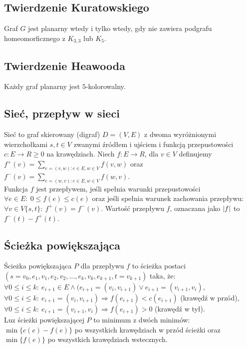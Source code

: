\subsection*{Twierdzenie Kuratowskiego}
Graf $G$ jest planarny wtedy i tylko wtedy, gdy nie zawiera podgrafu homeomorficznego
z $K_{3, 3}$ lub $K_5$.

\subsection*{Twierdzenie Heawooda}
Każdy graf planarny jest $5$-kolorowalny.

\subsection*{Sieć, przepływ w sieci}
Sieć to graf skierowany (digraf) $D = (V, E)$ z dwoma wyróżnionymi wierzchołkami
$s, t \in V$ zwanymi źródłem i ujściem i funkcją przepustowości $c: E \to R \geq 0$
na krawędziach. Niech $f: E \to R$, dla $v \in V$ definujemy 
$f^+(v) = \sum\limits_{e = (v, w): e \in E, w \in V} f(v, w)$ oraz
$f^-(v) = \sum\limits_{e = (w, v): e \in E, w \in V} f(w, v)$. \\ 
Funkcja $f$ jest przepływem, jeśli spełnia warunki przepustowości 
$\forall e \in E: \ 0 \leq f(e) \leq c(e)$ oraz jeśli spełnia warunek zachowania
przepływu: $\forall v \in V \{s, t\}: \ f^+(v) = f^-(v)$. Wartość przepływu $f$,
oznaczana jako $\left| f \right|$ to $f^-(t) - f^+(t)$.

\subsection*{Ścieżka powiększająca}
Ścieżka powiększająca $P$ dla przepływu $f$ to ścieżka postaci
$(s = v_0, e_1, v_1, e_2, v_2, \dots, e_k, v_k, e_{k+1}, t = v_{k+1})$ taka,
że: \\
$\forall 0 \leq i \leq k: \ e_{i+1} \in E \wedge (e_{i+1} = (v_i, v_{i+1})
\vee e_{i+1} = (v_{i+1}, v_i)$, \\
$\forall 0 \leq i \leq k: \ e_{i+1} = (v_i, v_{i+1}) \Longrightarrow
f(e_{i+1}) < c(e_{i+1})$ (krawędź w przód), \\
$\forall 0 \leq i \leq k: \ e_{i+1} = (v_{i+1}, v_i) \Longrightarrow
f(e_{i+1}) > 0$ (krawędź w tył). \\
Luz ścieżki powiększającej $P$ to minimum z dwóch minimów: 
$\min\{ c(e) - f(e) \}$ po wszystkich krawędziach w przód ścieżki oraz
$\min\{ f(e) \}$ po wszystkich krawędziach wstecznych.

